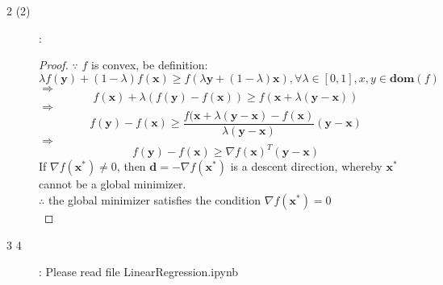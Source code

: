 \documentclass[UTF8]{ctexart}
\begin{document}
\begin{description}
\item[2 (2)]:
\begin{proof}
$\because$ $f$ is convex, be definition:
$$\lambda f(\bm{y}) + (1-\lambda)f(\bm{x}) \geq f(\lambda \bm{y}+(1-\lambda)\bm{x}), \forall \lambda \in [0,1], x,y\in\bm{dom}(f)$$
$\Rightarrow$
$$f(\bm{x}) + \lambda(f(\bm{y})-f(\bm{x})) \geq f(\bm{x}+\lambda(\bm{y}-\bm{x}))$$
$\Rightarrow$
$$f(\bm{y})-f(\bm{x}) \geq \frac{f(\bm{x}+\lambda(\bm{y}-\bm{x}) - f(\bm{x})}{\lambda(\bm{y}-\bm{x})}(\bm{y} - \bm{x})$$
$\Rightarrow$
$$f(\bm{y})-f(\bm{x}) \geq \nabla f(\bm{x})^T(\bm{y}-\bm{x})$$
If $\nabla f(\bm{x^*})\neq 0 $, then $\bm{d} = -\nabla f(\bm{x^*})$ is a descent direction, whereby $\bm{x^*}$ cannot be a global minimizer.\\
$\therefore$ the global minimizer satisfies the condition $\nabla f(\bm{x^*})=0$\\


\end{proof}

\item[3 4]: Please read file LinearRegression.ipynb\\
\end{description}
\end{document}

